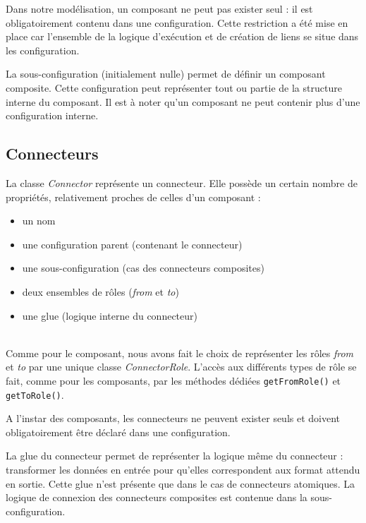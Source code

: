             Dans notre modélisation, un composant ne peut pas exister seul : il est obligatoirement contenu dans une configuration. Cette restriction a été mise en place car l'ensemble de la logique d'exécution et de création de liens se situe dans les configuration.
            \newline
            
            La sous-configuration (initialement nulle) permet de définir un composant composite. Cette configuration peut représenter tout ou partie de la structure interne du composant. Il est à noter qu'un composant ne peut contenir plus d'une configuration interne.
            
		\subsection{Connecteurs}
        	La classe \emph{Connector} représente un connecteur. Elle possède un certain nombre de propriétés, relativement proches de celles d'un composant :
            \begin{itemize}
            	\item un nom
                \item une configuration parent (contenant le connecteur)
                \item une sous-configuration (cas des connecteurs composites)
                \item deux ensembles de rôles (\emph{from} et \emph{to})
                \item une glue (logique interne du connecteur)
            \end{itemize}
            ~\\
            
            Comme pour le composant, nous avons fait le choix de représenter les rôles \emph{from} et \emph{to} par une unique classe \emph{ConnectorRole}. L'accès aux différents types de rôle se fait, comme pour les composants, par les méthodes dédiées \lstinline{getFromRole()} et \lstinline{getToRole()}.
            \newline
            
            A l'instar des composants, les connecteurs ne peuvent exister seuls et doivent obligatoirement être déclaré dans une configuration.
            \newline
            
            La glue du connecteur permet de représenter la logique même du connecteur : transformer les données en entrée pour qu'elles correspondent aux format attendu en sortie. Cette glue n'est présente que dans le cas de connecteurs atomiques. La logique de connexion des connecteurs composites est contenue dans la sous-configuration.
            
